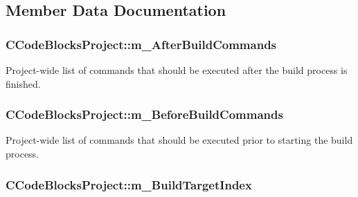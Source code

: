 \subsection{Member Data Documentation}
\hypertarget{classCCodeBlocksProject_a8ab245f49e6a9c903873054f36fc3131}{
\subsubsection[{m\-\_\-\-After\-Build\-Commands}]{\setlength{\rightskip}{0pt plus 5cm}C\-Code\-Blocks\-Project\-::m\-\_\-\-After\-Build\-Commands\hspace{0.3cm}{\ttfamily [private]}}}\label{classCCodeBlocksProject_a8ab245f49e6a9c903873054f36fc3131}


Project-\/wide list of commands that should be executed after the build process is finished. 

\hypertarget{classCCodeBlocksProject_aefda434d2b3f3b58ae91041e5832f9d0}{
\subsubsection[{m\-\_\-\-Before\-Build\-Commands}]{\setlength{\rightskip}{0pt plus 5cm}C\-Code\-Blocks\-Project\-::m\-\_\-\-Before\-Build\-Commands\hspace{0.3cm}{\ttfamily [private]}}}\label{classCCodeBlocksProject_aefda434d2b3f3b58ae91041e5832f9d0}


Project-\/wide list of commands that should be executed prior to starting the build process. 

\hypertarget{classCCodeBlocksProject_a7fc0903a694170fb8d3de2e62a788097}{
\subsubsection[{m\-\_\-\-Build\-Target\-Index}]{\setlength{\rightskip}{0pt plus 5cm}C\-Code\-Blocks\-Project\-::m\-\_\-\-Build\-Target\-Index\hspace{0.3cm}{\ttfamily [private]}}}\label{classCCodeBlocksProject_a7fc0903a694170fb8d3de2e62a788097}


